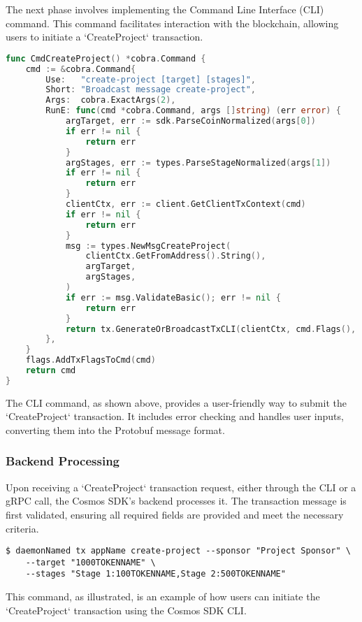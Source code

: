 The next phase involves implementing the Command Line Interface (CLI) command. This command facilitates interaction with the blockchain, allowing users to initiate a `CreateProject` transaction.

\newpage
\begin{lstlisting}[language=go, caption=CreateProject CLI protobuf definition, label={lst:create-project-cli}]
func CmdCreateProject() *cobra.Command {
	cmd := &cobra.Command{
		Use:   "create-project [target] [stages]",
		Short: "Broadcast message create-project",
		Args:  cobra.ExactArgs(2),
		RunE: func(cmd *cobra.Command, args []string) (err error) {
			argTarget, err := sdk.ParseCoinNormalized(args[0])
			if err != nil {
				return err
			}
			argStages, err := types.ParseStageNormalized(args[1])
			if err != nil {
				return err
			}
			clientCtx, err := client.GetClientTxContext(cmd)
			if err != nil {
				return err
			}
			msg := types.NewMsgCreateProject(
				clientCtx.GetFromAddress().String(),
				argTarget,
				argStages,
			)
			if err := msg.ValidateBasic(); err != nil {
				return err
			}
			return tx.GenerateOrBroadcastTxCLI(clientCtx, cmd.Flags(), msg)
		},
	}
	flags.AddTxFlagsToCmd(cmd)
	return cmd
}
\end{lstlisting}

The CLI command, as shown above, provides a user-friendly way to submit the `CreateProject` transaction. It includes error checking and handles user inputs, converting them into the Protobuf message format.

\subsubsection{Backend Processing}
\label{subsubsec:backend-createproject}

Upon receiving a `CreateProject` transaction request, either through the CLI or a gRPC call, the Cosmos SDK's backend processes it. The transaction message is first validated, ensuring all required fields are provided and meet the necessary criteria.

\begin{verbatim}
$ daemonNamed tx appName create-project --sponsor "Project Sponsor" \
    --target "1000TOKENNAME" \
    --stages "Stage 1:100TOKENNAME,Stage 2:500TOKENNAME"
\end{verbatim}

This command, as illustrated, is an example of how users can initiate the `CreateProject` transaction using the Cosmos SDK CLI.

